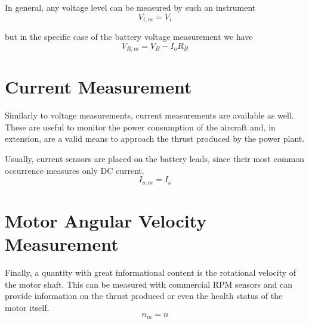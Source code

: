 In general, any voltage level can be measured by such an instrument
\begin{equation}
	V_{i,m} = V_i
\end{equation}

but in the specific case of the battery voltage measurement we have
\begin{equation}
	V_{B,m} = V_B - I_o R_B
\end{equation}

\section{Current Measurement}
Similarly to voltage measurements, current measurements are available as well. These are useful to monitor the power consumption of the aircraft and, in extension, are a valid means to approach the thrust produced by the power plant.

Usually, current sensors are placed on the battery leads, since their most common occurrence measures only DC current.
\begin{equation}
	I_{o,m} = I_o
\end{equation}

\section{Motor Angular Velocity Measurement}
Finally, a quantity with great informational content is the rotational velocity of the motor shaft. This can be measured with commercial RPM sensors and can provide information on the thrust produced or even the health status of the motor itself.
\begin{equation}
	n_{m} = n
\end{equation}
